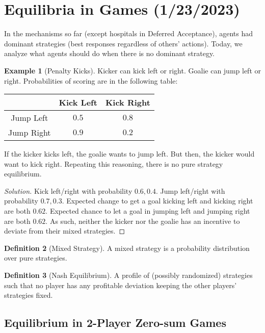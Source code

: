 \documentclass[dvipsnames]{article}
\theoremstyle{definition}
\newtheorem{definition}{Definition}[section]
\newtheorem{example}[definition]{Example}
\theoremstyle{remark}
\begin{document}
\newpage

\section{Equilibria in Games (1/23/2023)}

In the mechanisms so far (except hospitals in Deferred Acceptance), agents had dominant strategies (best responses regardless of others' actions). Today, we analyze what agents should do when there is no dominant strategy. 

\begin{example}[Penalty Kicks]
	Kicker can kick left or right. Goalie can jump left or right. Probabilities of scoring are in the following table: 
	\begin{table}[h]\centering
		\begin{tabular}{c|c|c|}
			& Kick Left & Kick Right \\ \hline
			Jump Left & $0.5$ & $0.8$  \\ \hline
			Jump Right & $0.9$ & $0.2$ \\ \hline
		\end{tabular}
	\end{table}
	If the kicker kicks left, the goalie wants to jump left. But then, the kicker would want to kick right. Repeating this reasoning, there is no pure strategy equilibrium.
\end{example}

\begin{proof}[Solution]
	Kick left/right with probability $0.6,0.4$. Jump left/right with probability $0.7,0.3$. Expected change to get a goal kicking left and kicking right are both $0.62$. Expected chance to let a goal in jumping left and jumping right are both $0.62$. As such, neither the kicker nor the goalie has an incentive to deviate from their mixed strategies. 
\end{proof}

\begin{definition}[Mixed Strategy]
	A mixed strategy is a probability distribution over pure strategies. 
\end{definition}

\begin{definition}[Nash Equilibrium]
	A profile of (possibly randomized) strategies such that no player has any profitable deviation keeping the other players' strategies fixed. 
\end{definition}

\subsection{Equilibrium in 2-Player Zero-sum Games}
\end{document}
